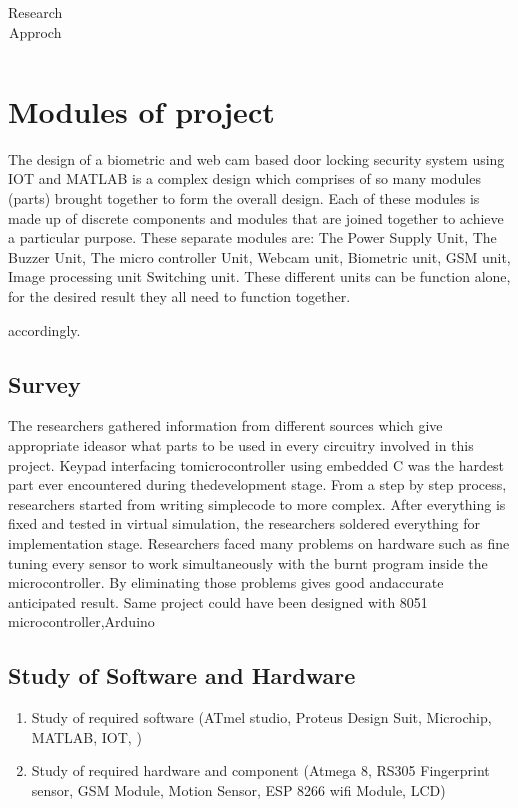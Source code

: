 \documentclass[twoside,a4paper,16pt]{book}
\begin{document}
{\begin{center}
\begin{table}[h!]
\begin{tabular}{|p{.8cm}|p{3cm}|p{3cm}|p{3cm}|p{4.5cm}|p{1cm}|}
			
			
			\hline
			
		\end{tabular}
		\caption{Research Approch}	
	\end{table}
	
\end{center}
\newpage
\section{Modules of project }
The design of a biometric and web cam based door locking security system using IOT and MATLAB is a complex design which
comprises of so many modules (parts) brought together to form the overall design. Each of these modules is
made up of discrete components and modules that are joined together to achieve a particular purpose. 
These separate modules are: The Power Supply Unit, The Buzzer Unit, The micro controller Unit, Webcam unit, Biometric unit, GSM unit, Image processing unit
Switching unit.
These different units can be function alone, for the desired result they all need to function together.

accordingly.
\subsection{Survey}
The researchers gathered information from different sources which give appropriate ideasor what parts to be used in every circuitry involved in this project. Keypad interfacing tomicrocontroller using embedded C was the hardest part ever encountered during thedevelopment stage. From a step by step process, researchers started from writing simplecode to more complex. After everything is fixed and tested in virtual simulation, the researchers soldered everything for implementation stage. Researchers faced many problems on hardware such as fine tuning every sensor to work simultaneously with the burnt program inside the microcontroller. By eliminating those problems gives good andaccurate anticipated result. Same project could have been designed with 8051 microcontroller,Arduino
\subsection{Study of Software and Hardware}
\begin{enumerate}
	\item Study of required software (ATmel studio, Proteus Design Suit, Microchip, MATLAB, IOT, )
	\item Study of required hardware and component (Atmega 8, RS305 Fingerprint sensor, GSM Module, Motion Sensor, ESP 8266 wifi Module, LCD)
\end{enumerate}
}
\end{document}
